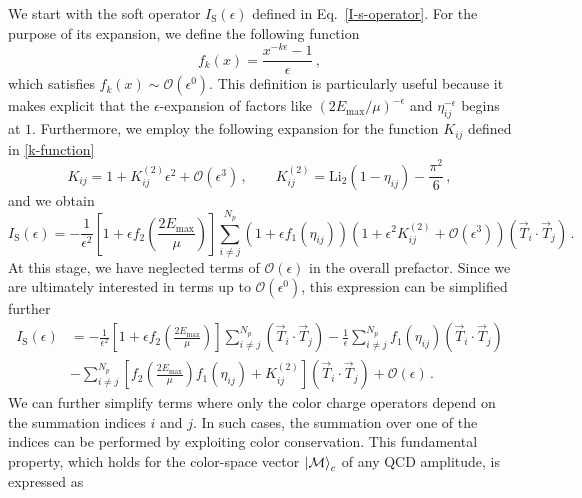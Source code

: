 \documentclass[a4paper, 12pt]{book}
\begin{document}
We start with the soft operator $I_{\mathrm{S}}(\epsilon)$ defined in Eq.~\ref{I-s-operator}. For the purpose of its expansion, we define the following function
\begin{equation}
  f_k(x) = \frac{x^{-k\epsilon}-1}{\epsilon} \, ,
\end{equation}
which satisfies $f_k(x) \sim \mathcal{O}(\epsilon^0) $. This definition is particularly useful because it makes explicit that the $\epsilon$-expansion of factors like $(2E_{\mathrm{max}}/\mu)^{-\epsilon}$ and $\eta_{ij}^{-\epsilon}$ begins at $1$. Furthermore, we employ the following expansion for the function $K_{ij}$ defined in \ref{k-function}
\begin{equation}
  K_{ij} = 1+ K_{ij}^{(2)} \epsilon^2 + \mathcal{O}(\epsilon^3) \, , \qquad  K_{ij}^{(2)} = \mathrm{Li}_2(1-\eta_{ij}) - \frac{\pi^2}{6} \, , 
\end{equation}
and we obtain 
\begin{equation}
  I_{\mathrm{S}}(\epsilon) = - \frac{1}{\epsilon^2} \left[1+\epsilon f_2 \left(\frac{2 E_{\mathrm{max}}}{\mu}\right)\right] \sum_{i \neq j}^{N_p} (1+\epsilon f_1(\eta_{ij}))(1+ \epsilon^2 K_{ij}^{(2)} + \mathcal{O}(\epsilon^3)) \left( \vec{T}_i \cdot \vec{T}_j\right) \,.
\end{equation}
At this stage, we have neglected terms of $\mathcal{O}(\epsilon)$ in the overall prefactor. Since we are ultimately interested in terms up to $\mathcal{O}(\epsilon^0)$, this expression can be simplified further
\begin{equation}
  \begin{aligned}
   I_{\mathrm{S}}(\epsilon) & = - \frac{1}{\epsilon^2} \left[1+\epsilon f_2 \left(\frac{2 E_{\mathrm{max}} }{\mu}\right)\right] \sum_{i \neq j}^{N_p}\left( \vec{T}_i \cdot \vec{T}_j\right) - \frac{1}{\epsilon} \sum_{i \neq j}^{N_p} f_1(\eta_{ij}) \left( \vec{T}_i \cdot \vec{T}_j\right)  \\
  & - \sum_{i \neq j}^{N_p} \left[f_2 \left(\frac{2 E_{\mathrm{max}} }{\mu}\right) f_1(\eta_{ij}) + K_{ij}^{(2)} \right] \left( \vec{T}_i \cdot \vec{T}_j\right) + \mathcal{O}(\epsilon) \, . 
  \end{aligned}
\end{equation}
We can further simplify terms where only the color charge operators depend on the summation indices $i$ and $j$. In such cases, the summation over one of the indices can be performed by exploiting color conservation. This fundamental property, which holds for the color-space vector $\ket{\mathcal{M}}_c$ of any QCD amplitude, is expressed as
\end{document}
